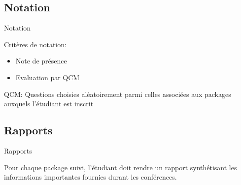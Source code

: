 \subsection{Notation}
\begin{frame}{Notation}

    Critères de notation:
    \begin{itemize}
    \item Note de présence
    \item Evaluation par QCM
    \end{itemize}

    QCM: Questions choisies aléatoirement parmi celles associées aux packages auxquels l'étudiant est inscrit

\end{frame}

\subsection{Rapports}
\begin{frame}{Rapports}

    Pour chaque package suivi, l'étudiant doit rendre un rapport synthétisant les informations importantes
    fournies durant les conférences.

\end{frame}
